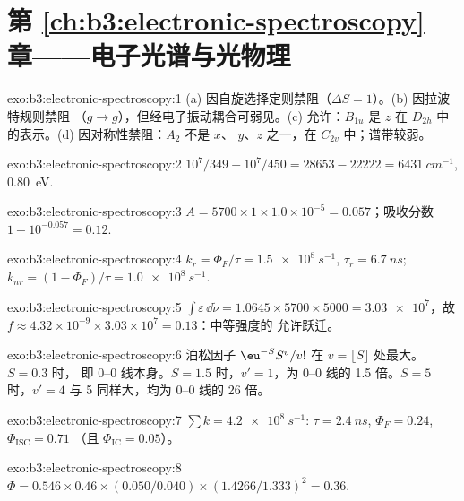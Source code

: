 \section*{第 \ref{ch:b3:electronic-spectroscopy} 章——电子光谱与光物理}

\begin{solution}{exo:b3:electronic-spectroscopy:1}
(a) 因自旋选择定则禁阻（$\Delta S = 1$）。(b) 因拉波特规则禁阻
（$g \to g$），但经电子振动耦合可弱见。(c) 允许：$B_{1u}$ 是
$z$ 在 $D_{2h}$ 中的表示。(d) 因对称性禁阻：$A_2$ 不是 $x$、
$y$、$z$ 之一，在 $C_{2v}$ 中；谱带较弱。
\end{solution}

\begin{solution}{exo:b3:electronic-spectroscopy:2}
$10^7/349 - 10^7/450 = 28653 - 22222 = \qty{6431}{cm^{-1}}$, \qty{0.80}{eV}.
\end{solution}

\begin{solution}{exo:b3:electronic-spectroscopy:3}
$A = 5700 \times 1 \times 1.0\times10^{-5} = 0.057$；吸收分数 $1 - 10^{-0.057} =
0.12$.
\end{solution}

\begin{solution}{exo:b3:electronic-spectroscopy:4}
$k_r = \Phi_F/\tau = \qty{1.5e8}{s^{-1}}$, $\tau_r = \qty{6.7}{ns}$; $k_{nr} = (1 - \Phi_F)/\tau
= \qty{1.0e8}{s^{-1}}$.
\end{solution}

\begin{solution}{exo:b3:electronic-spectroscopy:5}
$\int\varepsilon\,\dd\tilde\nu = 1.0645 \times 5700 \times 5000 = \num{3.03e7}$，故 $f \approx
4.32\times10^{-9} \times 3.03\times10^7 = 0.13$：中等强度的
允许跃迁。
\end{solution}

\begin{solution}{exo:b3:electronic-spectroscopy:6}
泊松因子 $\eu^{-S}S^v/v!$ 在 $v = \lfloor S\rfloor$ 处最大。$S = 0.3$ 时，
即 0--0 线本身。$S = 1.5$ 时，$v' = 1$，为 0--0 线的 1.5 倍。$S = 5$ 时，$v' = 4$
与 5 同样大，均为 0--0 线的 26 倍。
\end{solution}

\begin{solution}{exo:b3:electronic-spectroscopy:7}
$\sum k = \qty{4.2e8}{s^{-1}}$: $\tau = \qty{2.4}{ns}$, $\Phi_F = 0.24$, $\Phi_{\mathrm{ISC}} = 0.71$
（且 $\Phi_{\mathrm{IC}} = 0.05$）。
\end{solution}

\begin{solution}{exo:b3:electronic-spectroscopy:8}
$\Phi = 0.546 \times 0.46 \times (0.050/0.040) \times (1.4266/1.333)^2 = 0.36$.
\end{solution}

